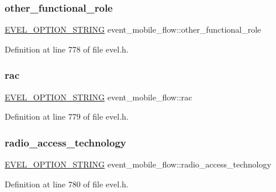 \subsubsection{\texorpdfstring{other\+\_\+functional\+\_\+role}{other\_functional\_role}}
{\footnotesize\ttfamily \hyperlink{evel_8h_a0de5113a7b72de93c0c7b644f7ea7ec3}{E\+V\+E\+L\+\_\+\+O\+P\+T\+I\+O\+N\+\_\+\+S\+T\+R\+I\+NG} event\+\_\+mobile\+\_\+flow\+::other\+\_\+functional\+\_\+role}



Definition at line 778 of file evel.\+h.

\hypertarget{structevent__mobile__flow_aa1d81531978633590263b8e8847c8efa}{}\label{structevent__mobile__flow_aa1d81531978633590263b8e8847c8efa} 
\subsubsection{\texorpdfstring{rac}{rac}}
{\footnotesize\ttfamily \hyperlink{evel_8h_a0de5113a7b72de93c0c7b644f7ea7ec3}{E\+V\+E\+L\+\_\+\+O\+P\+T\+I\+O\+N\+\_\+\+S\+T\+R\+I\+NG} event\+\_\+mobile\+\_\+flow\+::rac}



Definition at line 779 of file evel.\+h.

\hypertarget{structevent__mobile__flow_aae016bf13613264801561c3e89ffe452}{}\label{structevent__mobile__flow_aae016bf13613264801561c3e89ffe452} 
\subsubsection{\texorpdfstring{radio\+\_\+access\+\_\+technology}{radio\_access\_technology}}
{\footnotesize\ttfamily \hyperlink{evel_8h_a0de5113a7b72de93c0c7b644f7ea7ec3}{E\+V\+E\+L\+\_\+\+O\+P\+T\+I\+O\+N\+\_\+\+S\+T\+R\+I\+NG} event\+\_\+mobile\+\_\+flow\+::radio\+\_\+access\+\_\+technology}



Definition at line 780 of file evel.\+h.

\hypertarget{structevent__mobile__flow_a3e8c90cb39bd903229c8af4d66a2ae99}{}\label{structevent__mobile__flow_a3e8c90cb39bd903229c8af4d66a2ae99} 
